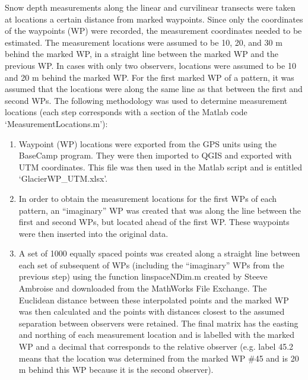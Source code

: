 \documentclass[12pt]{article}
\begin{document}
Snow depth measurements along the linear and curvilinear transects were taken at locations a certain distance from marked waypoints. Since only the coordinates of the waypoints (WP) were recorded, the measurement coordinates needed to be estimated. The measurement locations were assumed to be 10, 20, and 30 m behind the marked WP, in a straight line between the marked WP and the previous WP. In cases with only two observers, locations were assumed to be 10 and 20 m behind the marked WP. For the first marked WP of a pattern, it was assumed that the locations were along the same line as that between the first and second WPs. The following methodology was used to determine measurement locations (each step corresponds with a section of the Matlab code `MeasurementLocations.m'): 
\begin{enumerate}
\item Waypoint (WP) locations were exported from the GPS units using the BaseCamp program. They were then imported to QGIS and exported with UTM coordinates. This file was then used in the Matlab script and is entitled `GlacierWP\_UTM.xlsx'. 
\item In order to obtain the measurement locations for the first WPs of each pattern, an ``imaginary'' WP was created that was along the line between the first and second WPs, but located ahead of the first WP. These waypoints were then inserted into the original data. 
\item A set of 1000 equally spaced points was created along a straight line between each set of subsequent of WPs (including the ``imaginary'' WPs from the previous step) using the function linspaceNDim.m created by Steeve Ambroise and downloaded from the MathWorks File Exchange. The Euclidean distance between these interpolated points and the marked WP was then calculated and the points with distances closest to the assumed separation between observers were retained. The final matrix has the easting and northing of each measurement location and is labelled with the marked WP and a decimal that corresponds to the relative observer (e.g. label 45.2 means that the location was determined from the marked WP \#45 and is 20 m behind this WP because it is the second observer). 
\end{enumerate}
\end{document}
